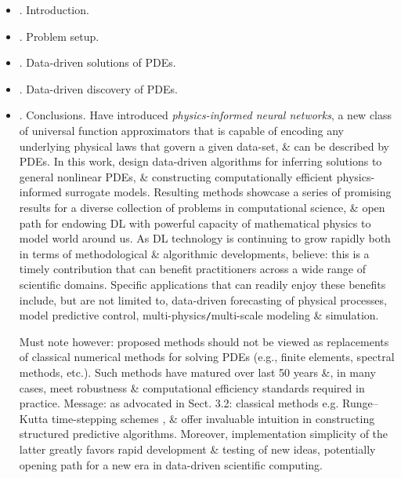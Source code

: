 \documentclass{article}
\begin{document}
\begin{itemize}
	\item {. Introduction.}
	\item {. Problem setup.}
	\item {. Data-driven solutions of PDEs.}
	\item {. Data-driven discovery of PDEs.}
	\item {. Conclusions.} Have introduced {\it physics-informed neural networks}, a new class of universal function approximators that is capable of encoding any underlying physical laws that govern a given data-set, \& can be described by PDEs. In this work, design data-driven algorithms for inferring solutions to general nonlinear PDEs, \& constructing computationally efficient physics-informed surrogate models. Resulting methods showcase a series of promising results for a diverse collection of problems in computational science, \& open path for endowing DL with powerful capacity of mathematical physics to model world around us. As DL technology is continuing to grow rapidly both in terms of methodological \& algorithmic developments, believe: this is a timely contribution that can benefit practitioners across a wide range of scientific domains. Specific applications that can readily enjoy these benefits include, but are not limited to, data-driven forecasting of physical processes, model predictive control, multi-physics{\tt/}multi-scale modeling \& simulation.
	
	Must note however: proposed methods should not be viewed as replacements of classical numerical methods for solving PDEs (e.g., finite elements, spectral methods, etc.). Such methods have matured over last 50 years \&, in many cases, meet robustness \& computational efficiency standards required in practice. Message: as advocated in Sect. 3.2: classical methods e.g. Runge--Kutta time-stepping schemes , \& offer invaluable intuition in constructing structured predictive algorithms. Moreover, implementation simplicity of the latter greatly favors rapid development \& testing of new ideas, potentially opening path for a new era in data-driven scientific computing.
	

\end{itemize}
\end{document}
